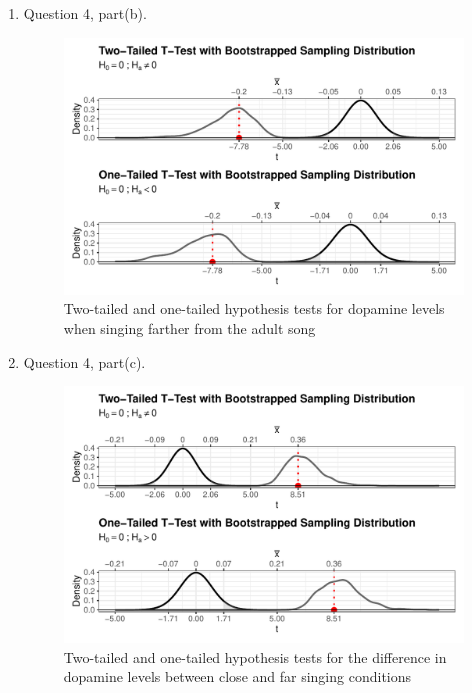 \documentclass{article}\usepackage[]{graphicx}\usepackage[]{xcolor}
\begin{document}
\begin{enumerate}
\begin{enumerate}
  \item Question 4, part(b).
   \begin{figure}[H]
  \begin{center}
  \includegraphics[scale=.8]{farther.hyp.plots.pdf}
  \caption{Two-tailed and one-tailed hypothesis tests for dopamine levels when singing farther from the adult song}
  \label{plot4}
  \end{center}
\end{figure} 
  
\newpage

  \item Question 4, part(c).
   \begin{figure}[H]
  \begin{center}
  \includegraphics[scale=.8]{diff.hyp.plots.pdf}
  \caption{Two-tailed and one-tailed hypothesis tests for the difference in dopamine levels between close and far singing conditions}
  \label{plot5}
  \end{center}
\end{figure} 
\end{enumerate}
\end{enumerate}



\end{document}
